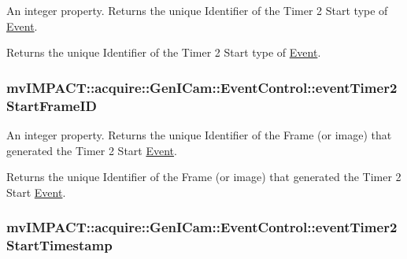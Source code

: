 An integer property. Returns the unique Identifier of the Timer 2 Start type of \hyperlink{classmv_i_m_p_a_c_t_1_1acquire_1_1_event}{Event}. 

Returns the unique Identifier of the Timer 2 Start type of \hyperlink{classmv_i_m_p_a_c_t_1_1acquire_1_1_event}{Event}. \hypertarget{classmv_i_m_p_a_c_t_1_1acquire_1_1_gen_i_cam_1_1_event_control_a751486bdb06db0ed8e4a62722fd6e68e}{
\subsubsection[{event\+Timer2\+Start\+Frame\+I\+D}]{ mv\+I\+M\+P\+A\+C\+T\+::acquire\+::\+Gen\+I\+Cam\+::\+Event\+Control\+::event\+Timer2\+Start\+Frame\+I\+D}}\label{classmv_i_m_p_a_c_t_1_1acquire_1_1_gen_i_cam_1_1_event_control_a751486bdb06db0ed8e4a62722fd6e68e}


An integer property. Returns the unique Identifier of the Frame (or image) that generated the Timer 2 Start \hyperlink{classmv_i_m_p_a_c_t_1_1acquire_1_1_event}{Event}. 

Returns the unique Identifier of the Frame (or image) that generated the Timer 2 Start \hyperlink{classmv_i_m_p_a_c_t_1_1acquire_1_1_event}{Event}. \hypertarget{classmv_i_m_p_a_c_t_1_1acquire_1_1_gen_i_cam_1_1_event_control_a445ba0ba3616d22a4bbb7d24554f1cba}{
\subsubsection[{event\+Timer2\+Start\+Timestamp}]{ mv\+I\+M\+P\+A\+C\+T\+::acquire\+::\+Gen\+I\+Cam\+::\+Event\+Control\+::event\+Timer2\+Start\+Timestamp}}\label{classmv_i_m_p_a_c_t_1_1acquire_1_1_gen_i_cam_1_1_event_control_a445ba0ba3616d22a4bbb7d24554f1cba}


